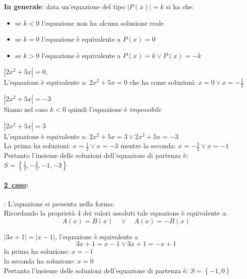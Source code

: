 \noindent \textbf{In generale}: data un'equazione del tipo $|P(x)|=k$ si ha che:
\begin{itemize}[nosep]
 \item se $k < 0$  l'equazione non ha alcuna soluzione reale
 \item se $k = 0$  l'equazione è equivalente a  $P(x) = 0$
 \item se $k > 0$   l'equazione è equivalente a  $P(x)=k \vee P(x)=-k$
\end{itemize}



\begin{esempio} 
\(|2x^2+5x|=0,\) \\[4pt]
L'equazione è equivalente a: \(2x^2+5x=0\)
che ha come soluzioni:
\(x=0 \vee x=-\frac{5}{2}\)
\end{esempio}

\begin{esempio} 
\(|2x^2+5x|=-3\)\\[4pt] Siamo nel caso $k < 0$ 
quindi l'equazione è \emph{impossibile}
\end{esempio}
        
\begin{esempio} 
\(|2x^2+5x|=3\)\\[4pt] L'equazione è equivalente a:
\(2x^2+5x=3 \vee 2x^2+5x=-3\) \\[4pt]
La prima ha soluzioni: $x=\frac{1}{2} \vee x=-3$ mentre la seconda: $x=-\frac{3}{2} \vee x=-1$\\[4pt]
Pertanto l'insieme delle soluzioni dell'equazione di partenza è: 
$S=\left\lbrace \frac{1}{2},-\frac{3}{2},-1,-3\right\rbrace $
\end{esempio}

\paragraph{\underline{2\textdegree~caso}:}: L'equazione si presenta nella forma:  
\\[4pt]
Ricordando la proprietà 4 dei valori assoluti tale equazione è equivalente a:
$$A(x)=B(x) \quad\vee\quad  A(x)=-B(x)$$

\begin{esempio} $|3x+1|=|x-1|$, l'equazione è equivalente a
$$3x+1=x-1 \vee 3x+1=-x+1$$
la prima ha soluzione: $x=-1$\\
la seconda ha soluzione: $x=0$\\
Pertanto l'insieme delle soluzioni dell'equazione di partenza è: 
$S=\left\lbrace -1,0 \right\rbrace $ 
\end{esempio}
                
